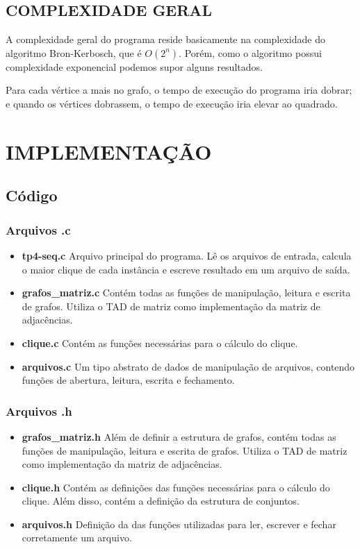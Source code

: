 \documentclass[12pt]{article}
\begin{document}
\subsection{COMPLEXIDADE GERAL}
\label{complexidades}

A complexidade geral do programa reside basicamente na complexidade do algoritmo Bron-Kerbosch, que é $O(2^n)$. Porém, como o algoritmo possui complexidade exponencial podemos supor alguns resultados.

Para cada vértice a mais no grafo, o tempo de execução do programa iria dobrar; e quando os vértices dobrassem, o tempo de execução iria elevar ao quadrado.

\section{IMPLEMENTAÇÃO}
\label{implementacao}

\subsection{Código}

\subsubsection{Arquivos .c}

\begin{itemize}
\item \textbf{tp4-seq.c} Arquivo principal do programa. Lê os arquivos de entrada, calcula o maior clique de cada instância e escreve resultado em um arquivo de saída.
\item \textbf{grafos\_matriz.c} Contém todas as funções de manipulação, leitura e escrita de grafos. Utiliza o TAD de matriz como implementação da matriz de adjacências.
\item \textbf{clique.c} Contém as funções necessárias para o cálculo do clique.
\item \textbf{arquivos.c} Um tipo abstrato de dados de manipulação de arquivos, contendo funções de abertura, leitura, escrita e fechamento.
\end{itemize}

\subsubsection{Arquivos .h}

\begin{itemize}
\item \textbf{grafos\_matriz.h} Além de definir a estrutura de grafos, contém todas as funções de manipulação, leitura e escrita de grafos. Utiliza o TAD de matriz como implementação da matriz de adjacências.
\item \textbf{clique.h} Contém as definições das funções necessárias para o cálculo do clique. Além disso, contém a definição da estrutura de conjuntos.
\item \textbf{arquivos.h} Definição da das funções utilizadas para ler, escrever e fechar corretamente um arquivo.
\end{itemize}
\end{document}
